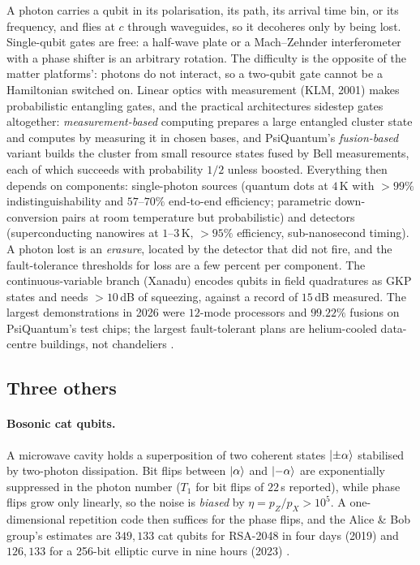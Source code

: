 A photon carries a qubit in its polarisation, its path, its arrival time bin, or its frequency,
and flies at $c$ through waveguides, so it decoheres only by being lost. Single-qubit gates are
free: a half-wave plate or a Mach--Zehnder interferometer with a phase shifter is an arbitrary
rotation. The difficulty is the opposite of the matter platforms': photons do not interact, so a
two-qubit gate cannot be a Hamiltonian switched on. Linear optics with measurement (KLM, 2001)
makes probabilistic entangling gates, and the practical architectures sidestep gates altogether:
\emph{measurement-based} computing prepares a large entangled cluster state and computes by
measuring it in chosen bases, and PsiQuantum's \emph{fusion-based} variant builds the cluster from
small resource states fused by Bell measurements, each of which succeeds with probability $1/2$
unless boosted. Everything then depends on components: single-photon sources (quantum dots at
$4$\,K with $>99\%$ indistinguishability and $57$--$70\%$ end-to-end efficiency; parametric
down-conversion pairs at room temperature but probabilistic) and detectors (superconducting
nanowires at $1$--$3$\,K, $>95\%$ efficiency, sub-nanosecond timing). A photon lost is an
\emph{erasure}, located by the detector that did not fire, and the fault-tolerance thresholds
for loss are a few percent per component. The continuous-variable branch (Xanadu) encodes
qubits in field quadratures as GKP states and needs $>10$\,dB of squeezing, against a record of
$15$\,dB measured. The largest demonstrations in 2026 were $12$-mode processors and
$99.22\%$ fusions on PsiQuantum's test chips; the largest fault-tolerant plans are helium-cooled
data-centre buildings, not chandeliers \cite{ph:uqt26}.

\subsection{Three others}

\paragraph{Bosonic cat qubits.} A microwave cavity holds a superposition of two coherent states
$\lvert \pm\alpha \rangle$ stabilised by two-photon dissipation. Bit flips between $\lvert \alpha \rangle$ and
$\lvert -\alpha \rangle$ are exponentially suppressed in the photon number ($T_1$ for bit flips of
$22$\,s reported), while phase flips grow only linearly, so the noise is \emph{biased} by
$\eta=p_Z/p_X>10^5$. A one-dimensional repetition code then suffices for the phase flips, and
the Alice \& Bob group's estimates are $349,133$ cat qubits for RSA-2048 in four days (2019) and
$126,133$ for a 256-bit elliptic curve in nine hours (2023) \cite{ph:cats19,ph:cats23}.

